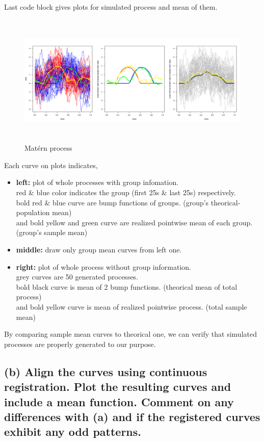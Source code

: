 \documentclass{article}
\begin{document}
Last code block gives plots for simulated process and mean of them.

\begin{figure}[hh]
    \centering
    \includegraphics[height=6.3cm]{matern_verify_sim.png}
    \caption{Mat\'{e}rn process}
\end{figure}

Each curve on plots indicates,
\begin{itemize}
    \item{\textbf{left:} plot of whole processes with group infomation.\\
    red \& blue color indicates the group (first 25s \& last 25s) respectively.\\
    bold red \& blue curve are bump functions of groups. (group's theorical-population mean)\\
    and bold yellow and green curve are realized pointwise mean of each group. (group's sample mean)}
    \item{\textbf{middle:} draw only group mean curves from left one.}
    \item{\textbf{right:} plot of whole process without group information.\\
    grey curves are 50 generated processes.\\
    bold black curve is mean of 2 bump functions. (theorical mean of total process)\\
    and bold yellow curve is mean of realized pointwise process. (total sample mean)}
\end{itemize}

By comparing sample mean curves to theorical one, we can verify that simulated processes are properly generated to our purpose.


\newpage
\subsection*{(b) Align the curves using continuous registration. Plot the resulting curves and include a mean function. 
Comment on any differences with (a) and if the registered curves exhibit any odd patterns.}
\end{document}
